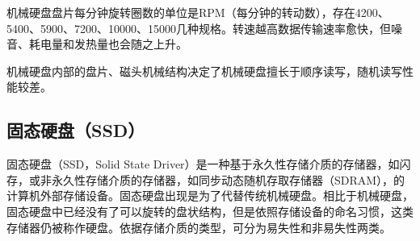 机械硬盘盘片每分钟旋转圈数的单位是RPM（每分钟的转动数），存在4200、5400、5900、7200、10000、15000几种规格。转速越高数据传输速率愈快，但噪音、耗电量和发热量也会随之上升。

机械硬盘内部的盘片、磁头机械结构决定了机械硬盘擅长于顺序读写，随机读写性能较差。

\subsection{固态硬盘（SSD）}
固态硬盘（SSD，Solid State Driver）是一种基于永久性存储介质的存储器，如闪存，或非永久性存储介质的存储器，如同步动态随机存取存储器（SDRAM），的计算机外部存储设备。固态硬盘出现是为了代替传统机械硬盘。相比于机械硬盘，固态硬盘中已经没有了可以旋转的盘状结构，但是依照存储设备的命名习惯，这类存储器仍被称作硬盘。依据存储介质的类型，可分为易失性和非易失性两类。

